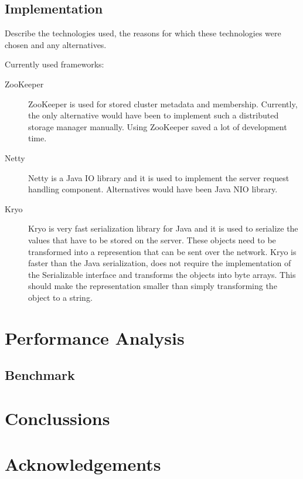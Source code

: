 \documentclass[11pt,a4paper]{globis-book}
\begin{document}
\section{Implementation}
Describe the technologies used, the reasons for which these technologies were chosen and any alternatives.

Currently used frameworks:
\begin{description}
    \item[ZooKeeper] ZooKeeper is used for stored cluster metadata and membership. Currently, the only alternative would have been to implement such a distributed storage manager manually. Using ZooKeeper saved a lot of development time. 
    \item[Netty] Netty is a Java IO library and it is used to implement the server request handling component. Alternatives would have been Java NIO library.
    \item[Kryo] Kryo is very fast serialization library for Java and it is used to serialize the values that have to be stored on the server. These objects need to be transformed into a represention that can be sent over the network. Kryo is faster than the Java serialization, does not require the implementation of the Serializable interface and transforms the objects into byte arrays. This should make the representation smaller than simply transforming the object to a string.
\end{description}
\chapter{Performance Analysis}
\section{Benchmark}

\chapter{Conclussions}

\appendix

\listoffigures
\listoftables

\chapter*{Acknowledgements}

\newpage
\thispagestyle{empty}



\end{document}
